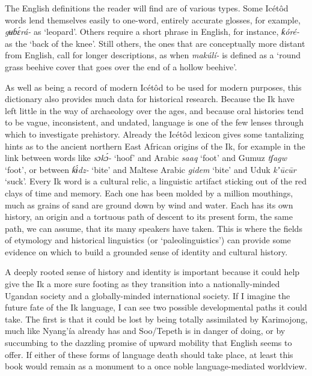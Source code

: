 The English definitions the reader will find are of various types. Some Icétôd words lend themselves easily to one-word, entirely accurate glosses, for example, \textit{gʉɓ\'{ɛ}rá- }as ‘leopard’. Others require a short phrase in English, for instance, \textit{ƙóré- }as the ‘back of the knee’. Still others, the ones that are conceptually more distant from English, call for longer descriptions, as when \textit{makúlí- }is defined as a ‘round grass beehive cover that goes over the end of a hollow beehive’.

As well as being a record of modern Icétôd to be used for modern purposes, this dictionary also provides much data for historical research. Because the Ik have left little in the way of archaeology over the ages, and because oral histories tend to be vague, inconsistent, and undated, language is one of the few lenses through which to investigate prehistory. Already the Icétôd lexicon gives some tantalizing hints as to the ancient northern East African origins of the Ik, for example in the link between words like \textit{sɔk\'{ɔ}- }‘hoof’ and Arabic \textit{saaq }‘foot’ and Gumuz \textit{tʃagw }‘foot’, or between \textit{ƙ\'{ɨ}dz- }‘bite’ and Maltese Arabic \textit{gidem }‘bite’ and Uduk \textit{kʼ\={u}c\={u}r }‘suck’. Every Ik word is a cultural relic, a linguistic artifact sticking out of the red clays of time and memory. Each one has been molded by a million mouthings, much as grains of sand are ground down by wind and water. Each has its own history, an origin and a tortuous path of descent to its present form, the same path, we can assume, that its many speakers have taken. This is where the fields of etymology and historical linguistics (or ‘paleolinguistics’) can provide some evidence on which to build a grounded sense of identity and cultural history.

A deeply rooted sense of history and identity is important because it could help give the Ik a more sure footing as they transition into a nationally-minded Ugandan society and a globally-minded international society. If I imagine the future fate of the Ik language, I can see two possible developmental paths it could take. The first is that it could be lost by being totally assimilated by Karimojong, much like Nyang’ía already has and Soo/Tepeth is in danger of doing, or by succumbing to the dazzling promise of upward mobility that English seems to offer. If either of these forms of language death should take place, at least this book would remain as a monument to a once noble language-mediated worldview.

